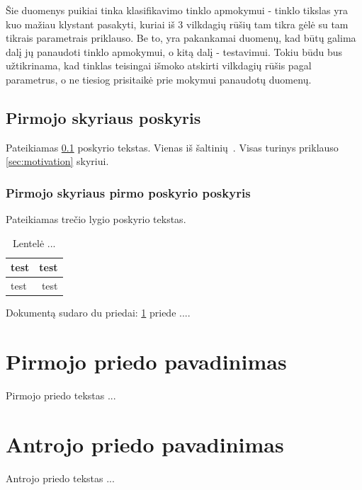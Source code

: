 \documentclass[a4paper,12pt,fleqn]{article}
\begin{document}
Šie duomenys puikiai tinka klasifikavimo tinklo apmokymui - tinklo tikslas yra kuo mažiau klystant pasakyti, kuriai iš 3 vilkdagių rūšių tam tikra gėlė su tam tikrais parametrais priklauso.
Be to, yra pakankamai duomenų, kad būtų galima dalį jų panaudoti tinklo apmokymui, o kitą dalį - testavimui.
Tokiu būdu bus užtikrinama, kad tinklas teisingai išmoko atskirti vilkdagių rūšis pagal parametrus, o ne tiesiog prisitaikė prie mokymui panaudotų duomenų.

\subsection{Pirmojo skyriaus poskyris}
\label{sec:example}
Pateikiamas \ref{sec:example} poskyrio tekstas. Vienas iš šaltinių~\cite{KTZ}. Visas turinys priklauso \ref{sec:motivation} skyriui.

\subsubsection{Pirmojo skyriaus pirmo poskyrio poskyris}
\label{sec:data}
Pateikiamas trečio lygio poskyrio tekstas.

\begin{table}[!ht]\centering
\caption{Lentelė ... }
\label{tabl:table}
\begin{tabular}{l|r|}
test&test\\ \hline
test&test\\
\end{tabular}
\end{table}








\newpage
\begin{appendices}
Dokumentą sudaro du priedai: \ref{app:a} priede  ....
\newpage
\section{Pirmojo priedo pavadinimas}
\label{app:a}
Pirmojo priedo tekstas ...

\newpage
\section{Antrojo priedo pavadinimas}
Antrojo priedo tekstas ...

\end{appendices}
\end{document}

